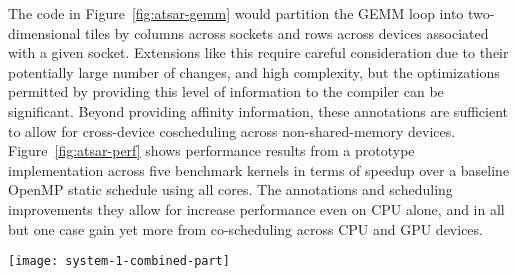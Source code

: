 The code in Figure~\ref{fig:atsar-gemm} would partition the GEMM loop into
two-dimensional tiles by columns across sockets and rows across devices
associated with a given socket.  Extensions like this require careful
consideration due to their potentially large number of changes, and high
complexity, but the optimizations permitted by providing this level of
information to the compiler can be significant.  Beyond providing affinity
information, these annotations are sufficient to allow for cross-device
coscheduling across non-shared-memory devices.  Figure~\ref{fig:atsar-perf}
shows performance results from a prototype implementation across five benchmark
kernels in terms of speedup over a baseline OpenMP static schedule using all
cores.  The annotations and scheduling improvements they allow for increase
performance even on CPU alone, and in all but one case gain yet more from
co-scheduling across CPU and GPU devices.


\begin{figure*}[t]
        \texttt{[image: system-1-combined-part]}
        \caption{Memory partitioning/affinity performance combined with
        cross-device coscheduling enabled by the same
      extensions.\label{fig:atsar-perf}}
\end{figure*}


